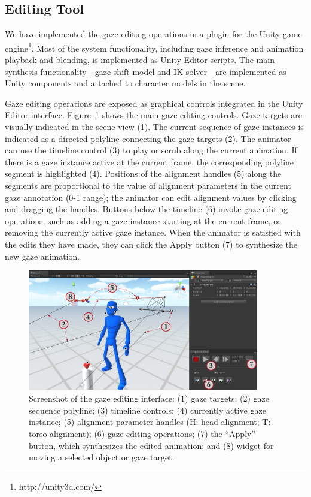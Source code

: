 \subsection{Editing Tool}

We have implemented the gaze editing operations in a plugin for the Unity game engine\footnote{http://unity3d.com/}. Most of the system functionality, including gaze inference and animation playback and blending, is implemented as Unity Editor scripts. The main synthesis functionality---gaze shift model and IK solver---are implemented as Unity components and attached to character models in the scene.

Gaze editing operations are exposed as graphical controls integrated in the Unity Editor interface. Figure~\ref{fig:GazeEditingTool} shows the main gaze editing controls. Gaze targets are visually indicated in the scene view (1). The current sequence of gaze instances is indicated as a directed polyline connecting the gaze targets (2).  The animator can use the timeline control (3) to play or scrub along the current animation. If there is a gaze instance active at the current frame, the corresponding polyline segment is highlighted (4). Positions of the alignment handles (5) along the segments are proportional to the value of alignment parameters in the current gaze annotation (0-1 range); the animator can edit alignment values by clicking and dragging the handles. Buttons below the timeline (6) invoke gaze editing operations, such as adding a gaze instance starting at the current frame, or removing the currently active gaze instance. When the animator is satisfied with the edits they have made, they can click the Apply button (7) to synthesize the new gaze animation.

\begin{figure}
\centering
\includegraphics[width=0.9\textwidth]{gazeauthoring/Figures/GazeEditingTool.pdf}
\caption{Screenshot of the gaze editing interface: (1) gaze targets; (2) gaze sequence polyline; (3) timeline controls; (4) currently active gaze instance; (5) alignment parameter handles (H: head alignment; T: torso alignment); (6) gaze editing operations; (7) the ``Apply'' button, which synthesizes the edited animation; and (8) widget for moving a selected object or gaze target.}
\label{fig:GazeEditingTool}
\end{figure}

